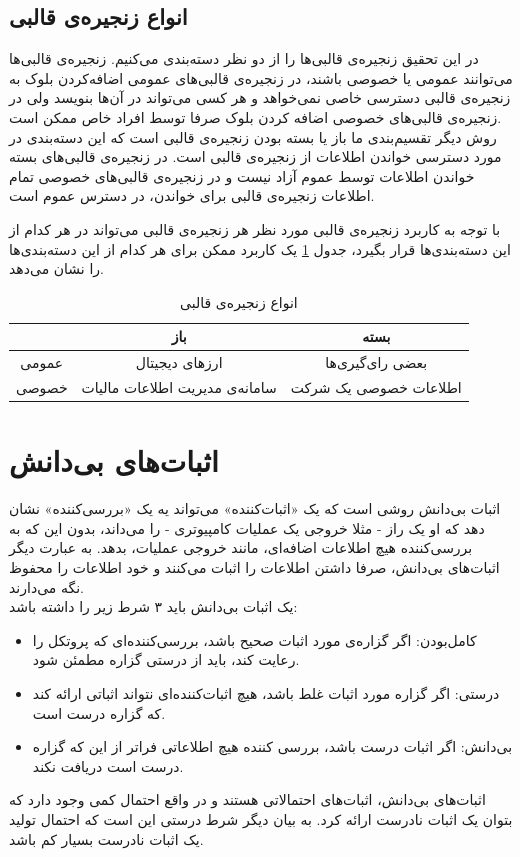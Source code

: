  \subsection{انواع زنجیره‌ی قالبی}
 در این تحقیق زنجیره‌ی قالبی‌ها را از دو نظر دسته‌‌بندی می‌کنیم. زنجیره‌ی قالبی‌ها می‌توانند عمومی یا خصوصی باشند، در زنجیره‌ی قالبی‌های عمومی اضافه‌کردن بلوک به زنجیره‌ی قالبی دسترسی خاصی نمی‌خواهد و هر کسی می‌تواند در آن‌ها بنویسد ولی در زنجیره‌ی قالبی‌های خصوصی اضافه کردن بلوک صرفا توسط افراد خاص ممکن است. 
 \\
 روش دیگر تقسیم‌بندی ما باز یا بسته بودن زنجیره‌ی قالبی است که این دسته‌بندی در مورد دسترسی خواندن اطلاعات از زنجیره‌ی قالبی است. در زنجیره‌ی قالبی‌های بسته خواندن اطلاعات توسط عموم آزاد نیست و در زنجیره‌ی قالبی‌های خصوصی تمام اطلاعات زنجیره‌ی قالبی برای خواندن، در دسترس عموم است. 
\par
با توجه به کاربرد زنجیره‌ی قالبی مورد نظر هر زنجیره‌ی قالبی می‌تواند در هر کدام از این دسته‌بندی‌ها قرار بگیرد، جدول  \ref{tab:tch} یک کاربرد ممکن برای هر کدام از این دسته‌بندی‌ها را نشان می‌دهد.

\begin{table}[h]
	\begin{center}
		\caption{انواع زنجیره‌ی قالبی}
		\begin{tabular}{|c|c|c|}
			\hline
			& باز & بسته \\
			\hline
			عمومی & ارز‌های دیجیتال & بعضی رای‌گیری‌ها \\
			\hline
			خصوصی & سامانه‌ی مدیریت اطلاعات مالیات & اطلاعات خصوصی یک شرکت \\
			\hline

		\end{tabular}
		\label{tab:tch}
	\end{center}
\end{table}


 
 
\section{اثبات‌های بی‌دانش}
اثبات‌ بی‌دانش 
روشی است که یک «اثبات‌کننده» می‌تواند یه یک «بررسی‌کننده» نشان دهد که او یک راز - مثلا خروجی یک عملیات کامپیوتری - را می‌داند، بدون این که به بررسی‌کننده هیچ اطلاعات اضافه‌ای، مانند خروجی عملیات، بدهد. به عبارت دیگر اثبات‌های بی‌دانش، صرفا داشتن اطلاعات را اثبات می‌کنند و خود اطلاعات را محفوظ نگه‌ می‌دارند.
\\
یک اثبات بی‌دانش باید ۳ شرط زیر را داشته باشد:
\begin{itemize}
	\item
	کامل‌بودن: اگر گزاره‌ی مورد اثبات صحیح باشد، بررسی‌کننده‌ای که پروتکل را رعایت کند، باید از درستی گزاره مطمئن شود.
	\item 
	درستی: اگر گزاره مورد اثبات غلط باشد، هیچ اثبات‌کننده‌ای نتواند اثباتی ارائه کند که گزاره درست است. 
	\item 
	بی‌دانش: اگر اثبات درست باشد، بررسی کننده هیچ اطلاعاتی فراتر از این که گزاره درست است دریافت نکند.
\end{itemize}
اثبات‌های بی‌دانش، اثبات‌های احتمالاتی هستند و در واقع احتمال کمی وجود دارد که بتوان یک اثبات نادرست ارائه کرد. به بیان دیگر شرط درستی این است که احتمال تولید یک اثبات نادرست بسیار کم باشد. 
